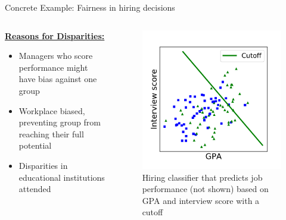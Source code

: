 \begin{frame}{Concrete Example: Fairness in hiring decisions \cite{barocas-hardt-narayanan}}
    \begin{columns}
\begin{column}{0.5\textwidth}
\underline{\textbf{Reasons for Disparities:}}\newline 

   \begin{itemize}
       \item Managers who score performance might have bias against one group
       \item Workplace biased, preventing group from reaching their full potential
       \item Disparities in educational institutions attended
   \end{itemize}
\end{column}
\begin{column}{0.5\textwidth}  %
    \begin{figure}
        \centering
        \includegraphics[width=.70\textwidth]{presentation/assets/toy_example.pdf}
        \caption{Hiring classifier that predicts job performance (not shown) based on GPA and interview score with a cutoff \cite{barocas-hardt-narayanan}}
        \label{fig:my_label}
    \end{figure}
\end{column}
\end{columns}
\end{frame}

